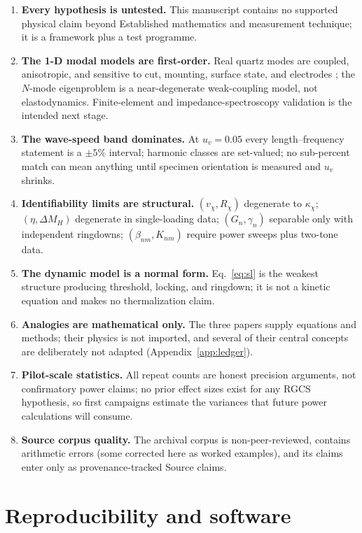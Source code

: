 \documentclass[10pt,letterpaper]{article}
\newcommand{\Rchi}{R_{\chi}}
\newcommand{\vchi}{v_{\chi}}
\newcommand{\kchi}{\kappa_{\chi}}
\newcommand{\uv}{u_{v}}
\begin{document}
\begin{enumerate}
\item \textbf{Every hypothesis is untested.} This manuscript contains no
supported physical claim beyond Established mathematics and measurement
technique; it is a framework plus a test programme.
\item \textbf{The 1-D modal models are first-order.} Real quartz modes are
coupled, anisotropic, and sensitive to cut, mounting, surface state, and
electrodes \citep{xie2022,hu2025,emser2024,luo2026}; the $N$-mode
eigenproblem is a near-degenerate weak-coupling model, not elastodynamics.
Finite-element and impedance-spectroscopy validation is the intended next
stage.
\item \textbf{The wave-speed band dominates.} At $\uv = 0.05$ every
length--frequency statement is a $\pm 5\%$ interval; harmonic classes are
set-valued; no sub-percent match can mean anything until specimen
orientation is measured and $\uv$ shrinks.
\item \textbf{Identifiability limits are structural.} $(\vchi, \Rchi)$
degenerate to $\kchi$; $(\eta, \Delta M_H)$ degenerate in single-loading
data; $(G_n, \gamma_n)$ separable only with independent ringdowns;
$(\beta_{nm}, K_{nm})$ require power sweeps plus two-tone data.
\item \textbf{The dynamic model is a normal form.} Eq.~\eqref{eq:sl} is
the weakest structure producing threshold, locking, and ringdown; it is
not a kinetic equation and makes no thermalization claim.
\item \textbf{Analogies are mathematical only.} The three papers supply
equations and methods; their physics is not imported, and several of their
central concepts are deliberately not adapted
(Appendix~\ref{app:ledger}).
\item \textbf{Pilot-scale statistics.} All repeat counts are honest
precision arguments, not confirmatory power claims; no prior effect sizes
exist for any RGCS hypothesis, so first campaigns estimate the variances
that future power calculations will consume.
\item \textbf{Source corpus quality.} The archival corpus is non-peer-reviewed,
contains arithmetic errors (some corrected here as worked examples), and
its claims enter only as provenance-tracked Source claims.
\end{enumerate}

\section{Reproducibility and software}\label{sec:software}
\end{document}
